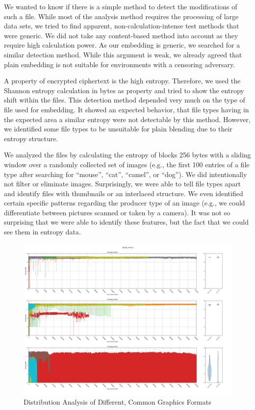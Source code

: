 We wanted to know if there is a simple method to detect the modifications of such a file. While most of the analysis method requires the processing of large data sets, we tried to find apparent, non-calculation-intense test methods that were generic. We did not take any content-based method into account as they require high calculation power. As our embedding is generic, we searched for a similar detection method. While this argument is weak, we already agreed that plain embedding is not suitable for environments with a censoring adversary.

A property of encrypted ciphertext is the high entropy. Therefore, we used the Shannon entropy calculation in bytes as property and tried to show the entropy shift within the files. This detection method depended very much on the type of file used for embedding. It showed an expected behavior, that file types having in the expected area a similar entropy were not detectable by this method. However, we identified some file types to be unsuitable for plain blending due to their entropy structure.

We analyzed the files by calculating the entropy of blocks 256 bytes with a sliding window over a randomly collected set of images (e.g., the first 100 entries of a file type after searching for ``mouse'', ``cat'', ``camel'', or ``dog''). We did intentionally not filter or eliminate images. Surprisingly, we were able to tell file types apart and identify files with thumbnails or an interlaced structure. We even identified certain specific patterns regarding the producer type of an image (e.g., we could differentiate between pictures scanned or taken by a camera). It was not so surprising that we were able to identify these features, but the fact that we could see them in entropy data.

\begin{figure}[ht]
	\includegraphics[width=\textwidth]{inc/statanalysis_graph}
	\caption{Distribution Analysis of Different, Common Graphics Formats}
	\label{fig:statGraph}
\end{figure}

